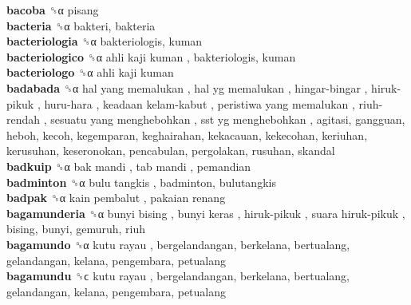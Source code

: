 \textbf{bacoba} ␝α  pisang  \\
\textbf{bacteria} ␝α  bakteri, bakteria  \\
\textbf{bacteriologia} ␝α  bakteriologis, kuman  \\
\textbf{bacteriologico} ␝α   ahli kaji kuman , bakteriologis, kuman  \\
\textbf{bacteriologo} ␝α   ahli kaji kuman   \\
\textbf{badabada} ␝α   hal yang memalukan ,  hal yg memalukan ,  hingar-bingar ,  hiruk-pikuk ,  huru-hara ,  keadaan kelam-kabut ,  peristiwa yang memalukan ,  riuh-rendah ,  sesuatu yang menghebohkan ,  sst yg menghebohkan , agitasi, gangguan, heboh, kecoh, kegemparan, keghairahan, kekacauan, kekecohan, keriuhan, kerusuhan, keseronokan, pencabulan, pergolakan, rusuhan, skandal  \\
\textbf{badkuip} ␝α   bak mandi ,  tab mandi , pemandian  \\
\textbf{badminton} ␝α   bulu tangkis , badminton, bulutangkis  \\
\textbf{badpak} ␝α   kain pembalut ,  pakaian renang   \\
\textbf{bagamunderia} ␝α   bunyi bising ,  bunyi keras ,  hiruk-pikuk ,  suara hiruk-pikuk , bising, bunyi, gemuruh, riuh  \\
\textbf{bagamundo} ␝α   kutu rayau , bergelandangan, berkelana, bertualang, gelandangan, kelana, pengembara, petualang  \\
\textbf{bagamundu} ␝ϲ   kutu rayau , bergelandangan, berkelana, bertualang, gelandangan, kelana, pengembara, petualang  \\
